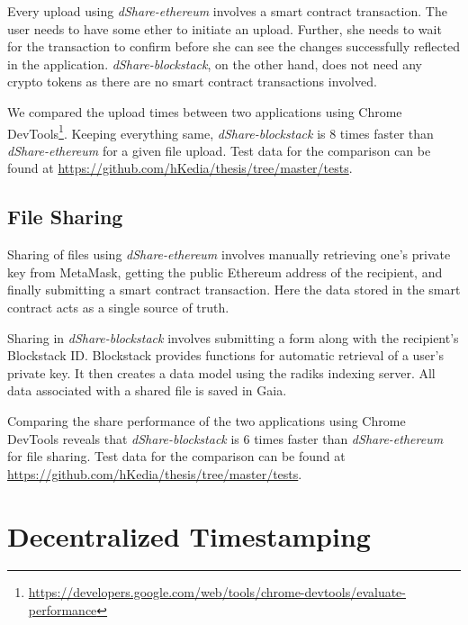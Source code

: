 		Every upload using \textit{dShare-ethereum} involves a smart contract transaction. The user needs to have some ether to initiate an upload. Further, she needs to wait for the transaction to confirm before she can see the changes successfully reflected in the application. \textit{dShare-blockstack}, on the other hand, does not need any crypto tokens as there are no smart contract transactions involved.
		
		We compared the upload times between two applications using Chrome DevTools\footnote{\url{https://developers.google.com/web/tools/chrome-devtools/evaluate-performance}}. Keeping everything same, \textit{dShare-blockstack} is 8 times faster than \textit{dShare-ethereum} for a given file upload. Test data for the comparison can be found at \url{https://github.com/hKedia/thesis/tree/master/tests}.
		
		\subsection{File Sharing}
			Sharing of files using \textit{dShare-ethereum} involves manually retrieving one's private key from MetaMask, getting the public Ethereum address of the recipient, and finally submitting a smart contract transaction. Here the data stored in the smart contract acts as a single source of truth.
			
			Sharing in \textit{dShare-blockstack} involves submitting a form along with the recipient's Blockstack ID. Blockstack provides functions for automatic retrieval of a user's private key. It then creates a data model using the radiks indexing server. All data associated with a shared file is saved in Gaia.
			
			Comparing the share performance of the two applications using Chrome DevTools reveals that \textit{dShare-blockstack} is 6 times faster than \textit{dShare-ethereum} for file sharing. Test data for the comparison can be found at \url{https://github.com/hKedia/thesis/tree/master/tests}.
		
	\section{Decentralized Timestamping}
	
